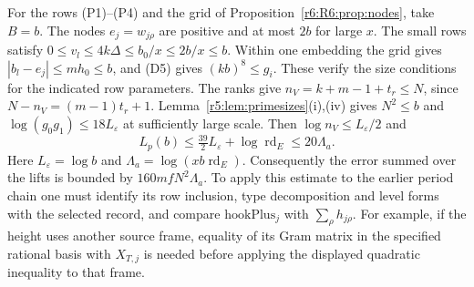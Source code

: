 For the rows (P1)--(P4) and the grid of Proposition~\ref{r6:R6:prop:nodes}, take $B=b$. The nodes $e_j=w_{j\rho}$ are positive and at most $2b$ for large $x$. The small rows satisfy $0\le v_l\le4k\Delta\le b_0/x\le2b/x\le b$. Within one embedding the grid gives $|b_l-e_j|\le mh_0\le b$, and (D5) gives $(kb)^8\le g_i$. These verify the size conditions for the indicated row parameters. The ranks give
$n_V=k+m-1+t_r\le N$, since $N-n_V=(m-1)t_r+1$.
Lemma~\ref{r5:lem:primesizes}(i),(iv) gives $N^2\le b$ and
$\log(g_0g_1)\le18L_\varepsilon$ at sufficiently large scale. Then
$\log n_V\le L_\varepsilon/2$ and
\[
 L_p(b)\le\tfrac{39}{2}L_\varepsilon+\log\operatorname{rd}_E
     \le20\Lambda_a .
\]
Here $L_\varepsilon=\log b$ and $\Lambda_a=\log(xb\operatorname{rd}_E)$.
Consequently the error summed over the lifts is bounded by
$160mfN^2\Lambda_a$. To apply this estimate to the earlier period
chain one must identify its row inclusion, type decomposition and
level forms with the selected record, and compare $\mathrm{hookPlus}_j$ with $\sum_\rho h_{j\rho}$.
For example, if the height uses another source frame, equality of its
Gram matrix in the specified rational basis with $X_{T,j}$ is needed
before applying the displayed quadratic inequality to that frame.
